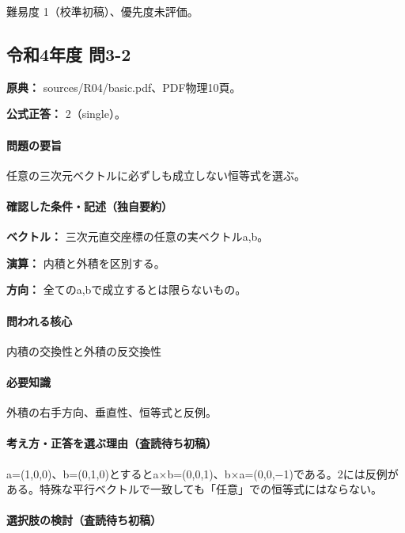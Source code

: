 \par 難易度 1（校準初稿）、優先度未評価。

\subsection{令和4年度 問3-2}
\label{q:r04-reg-basic-3-2}

\noindent\textbf{原典：} sources/R04/basic.pdf、PDF物理10頁。

\textbf{公式正答：} 2（single）。

\paragraph{問題の要旨} 任意の三次元ベクトルに必ずしも成立しない恒等式を選ぶ。

\paragraph{確認した条件・記述（独自要約）}\mbox{}\par

\noindent\textbf{ベクトル：} 三次元直交座標の任意の実ベクトルa,b。\par

\noindent\textbf{演算：} 内積と外積を区別する。\par

\noindent\textbf{方向：} 全てのa,bで成立するとは限らないもの。\par

\paragraph{問われる核心} 内積の交換性と外積の反交換性

\paragraph{必要知識} 外積の右手方向、垂直性、恒等式と反例。

\paragraph{考え方・正答を選ぶ理由（査読待ち初稿）} a=\allowbreak{}(1,0,0)、b=\allowbreak{}(0,1,0)とするとa×b=\allowbreak{}(0,0,1)、b×a=\allowbreak{}(0,0,−1)である。2には反例がある。特殊な平行ベクトルで一致しても「任意」での恒等式にはならない。

\paragraph{選択肢の検討（査読待ち初稿）}\mbox{}\par

